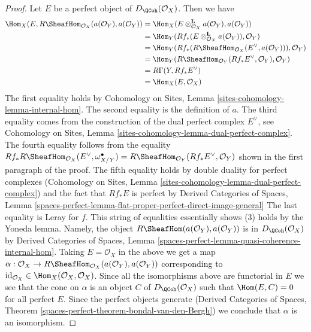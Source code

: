 \begin{proof}
\medskip\noindent
Let $E$ be a perfect object of $D_\QCoh(\mathcal{O}_X)$. Then
we have
\begin{align*}
\Hom_X(E, R\SheafHom_{\mathcal{O}_X}(a(\mathcal{O}_Y), a(\mathcal{O}_Y))
& =
\Hom_X(E \otimes_{\mathcal{O}_X}^\mathbf{L} a(\mathcal{O}_Y),
a(\mathcal{O}_Y)) \\
& =
\Hom_Y(Rf_*(E \otimes_{\mathcal{O}_X}^\mathbf{L} a(\mathcal{O}_Y)),
\mathcal{O}_Y) \\
& =
\Hom_Y(Rf_*(R\SheafHom_{\mathcal{O}_X}(E^\vee, a(\mathcal{O}_Y))),
\mathcal{O}_Y) \\
& =
\Hom_Y(R\SheafHom_{\mathcal{O}_Y}(Rf_*E^\vee, \mathcal{O}_Y),
\mathcal{O}_Y) \\
& =
R\Gamma(Y, Rf_*E^\vee) \\
& =
\Hom_X(E, \mathcal{O}_X)
\end{align*}
The first equality holds by Cohomology on Sites, Lemma
\ref{sites-cohomology-lemma-internal-hom}.
The second equality is the definition of $a$.
The third equality comes from the construction of the dual perfect
complex $E^\vee$, see Cohomology on Sites, Lemma
\ref{sites-cohomology-lemma-dual-perfect-complex}.
The fourth equality follows from the equality
$Rf_*R\SheafHom_{\mathcal{O}_X}(E^\vee, \omega_{X/Y}^\bullet) =
R\SheafHom_{\mathcal{O}_Y}(Rf_*E^\vee, \mathcal{O}_Y)$
shown in the first paragraph of the proof.
The fifth equality holds by double duality for perfect complexes
(Cohomology on Sites, Lemma
\ref{sites-cohomology-lemma-dual-perfect-complex})
and the fact that $Rf_*E$ is perfect by
Derived Categories of Spaces, Lemma
\ref{spaces-perfect-lemma-flat-proper-perfect-direct-image-general}
The last equality is Leray for $f$.
This string of equalities essentially shows (3)
holds by the Yoneda lemma. Namely, the object
$R\SheafHom(a(\mathcal{O}_Y), a(\mathcal{O}_Y))$
is in $D_\QCoh(\mathcal{O}_X)$ by Derived Categories of Spaces, Lemma
\ref{spaces-perfect-lemma-quasi-coherence-internal-hom}.
Taking $E = \mathcal{O}_X$ in the above we get a map
$\alpha : \mathcal{O}_X \to
R\SheafHom_{\mathcal{O}_X}(a(\mathcal{O}_Y), a(\mathcal{O}_Y))$
corresponding to
$\text{id}_{\mathcal{O}_X} \in \Hom_X(\mathcal{O}_X, \mathcal{O}_X)$.
Since all the isomorphisms above are functorial in $E$ we
see that the cone on $\alpha$ is an object $C$ of $D_\QCoh(\mathcal{O}_X)$
such that $\Hom(E, C) = 0$ for all perfect $E$.
Since the perfect objects generate
(Derived Categories of Spaces, Theorem
\ref{spaces-perfect-theorem-bondal-van-den-Bergh})
we conclude that $\alpha$ is an isomorphism.
\end{proof}











